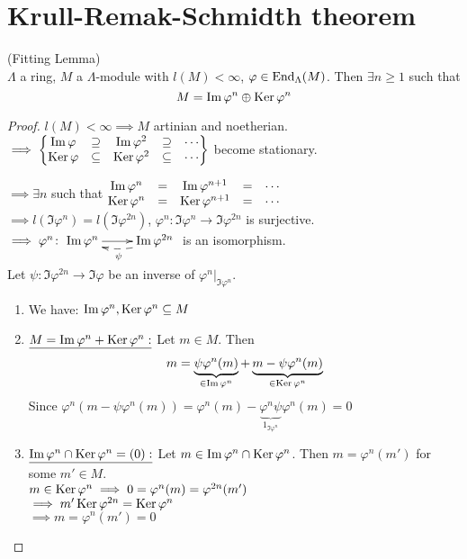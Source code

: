 \section{Krull-Remak-Schmidth theorem}

\begin{lem}\label{lem:41}
(Fitting Lemma)\\
$\Lambda$ a ring, $M$ a $\Lambda$-module with $l(M) < \infty$, $\varphi \in \operatorname{End}_\Lambda(M)$. Then $\exists n \geq 1$ such that \[M = \operatorname{Im}\nolimits \varphi^n \oplus \operatorname{Ker}\nolimits \varphi^n\]
\end{lem}
\begin{proof}
$l(M) < \infty \implies M$ artinian and noetherian.\\
$\implies \left\lbrace \begin{matrix}
\operatorname{Im}\nolimits \varphi & \supseteq & \operatorname{Im}\nolimits \varphi^2 & \supseteq & \cdots\\
\operatorname{Ker}\nolimits \varphi & \subseteq & \operatorname{Ker}\nolimits \varphi^2 & \subseteq & \cdots\\ 
\end{matrix} \right\rbrace$ become stationary.

$\implies \exists n$ such that $\begin{matrix}
\operatorname{Im}\nolimits \varphi^n & = & \operatorname{Im}\nolimits \varphi^{n+1} & = & \cdots\\
\operatorname{Ker}\nolimits \varphi^n & = & \operatorname{Ker}\nolimits \varphi^{n+1} & = & \cdots\\ 
\end{matrix}$\\
$\implies l(\Im \varphi^n) = l(\Im \varphi^{2n})$, $\varphi^n : \Im
\varphi^n \to \Im \varphi^{2n}$ is surjective.\\
$\implies \varphi^n\colon  \xymatrix{\Im \varphi^n \ar[r] \ar@{<--}@/_/[r]_\psi & \Im \varphi^{2n}}$ is an isomorphism.\\
Let $\psi\colon  \Im \varphi^{2n} \to \Im \varphi$ be an inverse of $\varphi^n|_{\Im\varphi^n}$.
\begin{enumerate}
\item We have: $\operatorname{Im}\nolimits \varphi^n, \operatorname{Ker}\nolimits \varphi^n \subseteq M$
\item $\underline{M = \operatorname{Im}\nolimits \varphi^n + \operatorname{Ker}\nolimits \varphi^n :}$ Let $m \in M$. Then \[m = \underbrace{\psi\varphi^n(m)}_{\in \operatorname{Im}\nolimits \varphi^n} + \underbrace{m - \psi\varphi^n(m)}_{\in \operatorname{Ker}\nolimits \varphi^n}\]
Since $\varphi^n(m - \psi\varphi^n(m)) = \varphi^n(m) - \underbrace{\varphi^n\psi}_{1_{\Im \varphi^n}}\varphi^n(m) = 0$
\item $\underline{\operatorname{Im}\nolimits \varphi^n \cap \operatorname{Ker}\nolimits \varphi^n = (0):}$ Let $m \in \operatorname{Im}\nolimits \varphi^n \cap \operatorname{Ker}\nolimits \varphi^n$. Then $m = \varphi^n(m')$ for some $m' \in M$.\\
$m \in \operatorname{Ker}\nolimits \varphi^n \implies 0 = \varphi^n(m) = \varphi^{2n}(m')$\\
$\implies m' \operatorname{Ker}\nolimits \varphi^{2n} = \operatorname{Ker}\nolimits \varphi^n$\\
$\implies m = \varphi^n(m') = 0$
\end{enumerate}
\end{proof}

